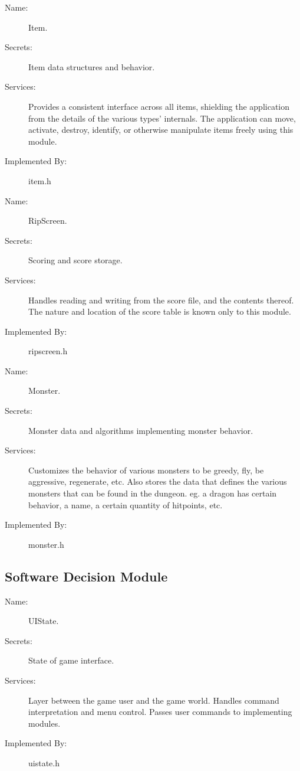 \documentclass[12pt, titlepage]{article}
\begin{document}
        \bigskip\begin{description}
            \item[Name:]Item.
            \item[Secrets:]Item data structures and behavior.
            \item[Services:]Provides a consistent interface across all items, shielding the application from the details of the various types' internals. The application can move, activate, destroy, identify, or otherwise manipulate items freely using this module.
            \item[Implemented By:]item.h
        \end{description}

        \bigskip\begin{description}
            \item[Name:]RipScreen.
            \item[Secrets:]Scoring and score storage.
            \item[Services:]Handles reading and writing from the score file, and the contents thereof. The nature and location of the score table is known only to this module.
            \item[Implemented By:]ripscreen.h
        \end{description}

        \bigskip\begin{description}
            \item[Name:]Monster.
            \item[Secrets:]Monster data and algorithms implementing monster behavior.
            \item[Services:]Customizes the behavior of various monsters to be greedy, fly, be aggressive, regenerate, etc. Also stores the data that defines the various monsters that can be found in the dungeon. eg. a dragon has certain behavior, a name, a certain quantity of hitpoints, etc.
            \item[Implemented By:]monster.h
        \end{description}

    \subsection{Software Decision Module}

        \bigskip\begin{description}
            \item[Name:]UIState.
            \item[Secrets:]State of game interface.
            \item[Services:]Layer between the game user and the game world. Handles command interpretation and menu control. Passes user commands to implementing modules.
            \item[Implemented By:]uistate.h
        \end{description}
\end{document}
